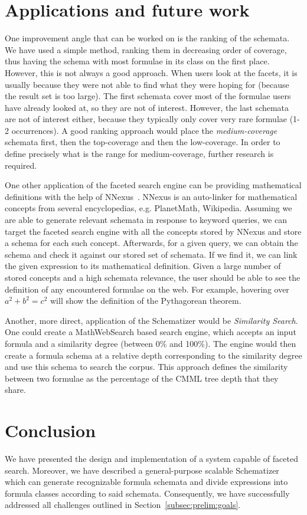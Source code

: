 \documentclass[a4paper,oneside]{article}
\def\mws{\textsf{MathWebSearch}\xspace}
\begin{document}
\section{Applications and future work}\label{sec:future}
One improvement angle that can be worked on is the ranking of the schemata.
We have used a simple method, ranking them in decreasing order of coverage,
thus having the schema with most formulae in its class on the first place.
However, this is not always a good approach. When users look at the facets,
it is usually because they were not able to find what they were hoping for
(because the result set is too large). The first schemata cover most of the
formulae users have already looked at, so they are not of interest.
However, the last schemata are not of interest either, because they typically
only cover very rare formulae (1-2 occurrences). A good ranking approach would
place the \textit{medium-coverage} schemata first, then the top-coverage and
then the low-coverage. In order to define precisely what is the range for
medium-coverage, further research is required.

One other application of the faceted search engine can be providing
mathematical definitions with the help of
\textsf{NNexus}~\cite{GinCor:nnexus:14}. NNexus is an auto-linker for
mathematical concepts from several encyclopedias, e.g.  PlanetMath, Wikipedia.
Assuming we are able to generate relevant schemata in response to keyword
queries, we can target the faceted search engine with all the concepts stored
by NNexus and store a schema for each such concept.  Afterwards, for a given
query, we can obtain the schema and check it against our stored set of
schemata. If we find it, we can link the given expression to its mathematical
definition. Given a large number of stored concepts and a high schemata
relevance, the user should be able to see the definition of any encountered
formulae on the web. For example, hovering over $a^2 + b^2 = c^2$ will show the
definition of the Pythagorean theorem.

Another, more direct, application of the Schematizer would be
\textit{Similarity Search}. One could create a \mws based search engine, which
accepts an input formula and a similarity degree (between 0\% and 100\%). The
engine would then create a formula schema at a relative depth corresponding to
the similarity degree and use this schema to search the corpus. This approach
defines the similarity between two formulae as the percentage of the CMML tree
depth that they share.

\section{Conclusion}\label{sec:conclusion}
We have presented the design and implementation of a system capable of faceted
search. Moreover, we have described a general-purpose scalable Schematizer
which can generate recognizable formula schemata and divide expressions into
formula classes according to said schemata. Consequently, we have successfully
addressed all challenges outlined in Section~\ref{subsec:prelim:goals}.
\end{document}
